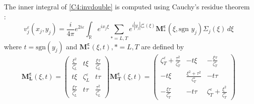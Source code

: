 The inner integral of \eqref{C4:invdouble} is computed using Cauchy's residue theorem :
\begin{equation}
v_j^{\varepsilon}(x_j,y_j)=\frac{i}{4\pi}e^{2i\varepsilon}\int_{\mathbb{R}} e^{ix_j\xi}\sum_{*=L,T}e^{i|y_j|\zeta_*^{\varepsilon}(\xi)}\mathbf{M_*^{\varepsilon}}(\xi,\mbox{sgn }y_j)\Sigma_j(\xi)\,d\xi
\label{C4:vjeps}
\end{equation}
where $t=\mbox{sgn}( y_j)$ and $\mathbf{M_*^{\varepsilon}}(\xi,t), *=L,T$ are defined by
\begin{subequations}
\begin{equation}
\mathbf{M_L^{\varepsilon}}(\xi,t)=\begin{pmatrix}
\frac{\xi^2}{\zeta_L^{\varepsilon}} &t\xi & \frac{\xi\tau}{\zeta_L^{\varepsilon}} \\
t\xi & \zeta_L^{\varepsilon} & t\tau \\
\frac{\xi\tau}{\zeta_L^{\varepsilon}}& t\tau & \frac{\tau^2}{\zeta_L^{\varepsilon}}
\end{pmatrix}
\label{C4:MLeps}
\end{equation}
\begin{equation}
\mathbf{M_T^{\varepsilon}}(\xi,t)=\begin{pmatrix}
\zeta_T^{\varepsilon} +\frac{\tau^2}{\zeta_T^{\varepsilon}}& -t\xi &-\frac{\xi\tau}{\zeta_T^{\varepsilon}}\\
-t\xi & \frac{\xi^2+\tau^2}{\zeta_T^{\varepsilon}}&-t\tau \\
-\frac{\xi\tau}{\zeta_T^{\varepsilon}}&-t\tau&\zeta_T^{\varepsilon} +\frac{\xi^2}{\zeta_T^{\varepsilon}}
\end{pmatrix}
\label{C4:MTeps}
\end{equation}
\label{C4:M*eps}
\end{subequations}

